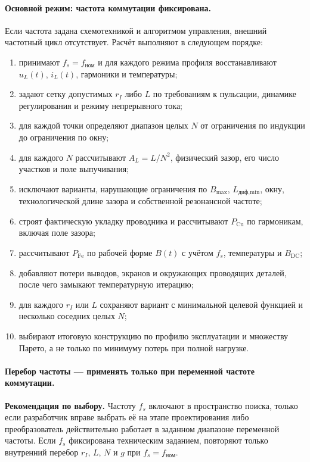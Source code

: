 \documentclass[14pt,a4paper]{extarticle}
\newcommand{\recommend}{\par\noindent\textbf{Рекомендация по выбору.} }
\begin{document}
\paragraph{Основной режим: частота коммутации фиксирована.}

Если частота задана схемотехникой и алгоритмом управления, внешний
частотный цикл отсутствует. Расчёт выполняют в следующем порядке:
\begin{enumerate}
\item принимают $f_s=f_{\text{ном}}$ и для каждого режима профиля
восстанавливают $u_L(t)$, $i_L(t)$, гармоники и температуры;
\item задают сетку допустимых $r_I$ либо $L$ по требованиям к пульсации,
динамике регулирования и режиму непрерывного тока;
\item для каждой точки определяют диапазон целых $N$ от ограничения по
индукции до ограничения по окну;
\item для каждого $N$ рассчитывают $A_L=L/N^2$, физический зазор, его
число участков и поле выпучивания;
\item исключают варианты, нарушающие ограничения по $B_{\max}$,
$L_{\text{диф,min}}$, окну, технологической длине зазора и собственной
резонансной частоте;
\item строят фактическую укладку проводника и рассчитывают
$P_{\text{Cu}}$ по гармоникам, включая поле зазора;
\item рассчитывают $P_{\text{Fe}}$ по рабочей форме $B(t)$ с учётом
$f_s$, температуры и $B_{\text{DC}}$;
\item добавляют потери выводов, экранов и окружающих проводящих деталей,
после чего замыкают температурную итерацию;
\item для каждого $r_I$ или $L$ сохраняют вариант с минимальной целевой
функцией и несколько соседних целых $N$;
\item выбирают итоговую конструкцию по профилю эксплуатации и множеству
Парето, а не только по минимуму потерь при полной нагрузке.
\end{enumerate}

\paragraph{Перебор частоты --- применять только при переменной частоте
коммутации.}

\recommend Частоту $f_s$ включают в пространство поиска, только если
разработчик вправе выбрать её на этапе проектирования либо преобразователь
действительно работает в заданном диапазоне переменной частоты. Если
$f_s$ фиксирована техническим заданием, повторяют только внутренний
перебор $r_I$, $L$, $N$ и $g$ при $f_s=f_{\text{ном}}$.
\end{document}
